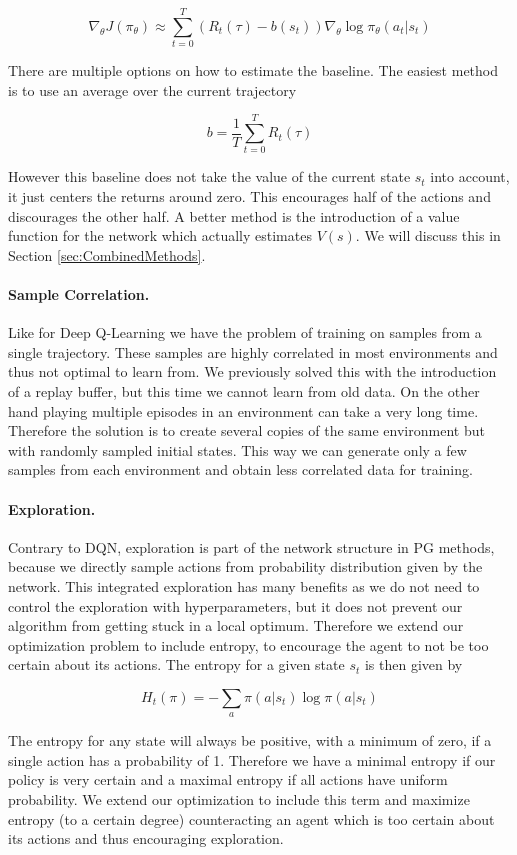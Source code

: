 \[\nabla_\theta J(\pi_\theta) \approx \sum^T_{t=0}(R_t(\tau) - b(s_t)) \nabla_\theta \log \pi_\theta(a_t|s_t)\]

There are multiple options on how to estimate the baseline. The easiest method is to use an average over the current trajectory

\[b = \frac{1}{T} \sum^T_{t=0}R_t(\tau)\]

However this baseline does not take the value of the current state $s_t$ into account, it just centers the returns around zero. This encourages half of the actions and discourages the other half. A better method is the introduction of a value function for the network which actually estimates $V(s)$. We will discuss this in Section \ref{sec:CombinedMethods}.

\paragraph{Sample Correlation.}
Like for Deep Q-Learning we have the problem of training on samples from a single trajectory. These samples are highly correlated in most environments and thus not optimal to learn from. We previously solved this with the introduction of a replay buffer, but this time we cannot learn from old data. On the other hand playing multiple episodes in an environment can take a very long time. Therefore the solution is to create several copies of the same environment but with randomly sampled initial states. This way we can generate only a few samples from each environment and obtain less correlated data for training.

\paragraph{Exploration.}
Contrary to DQN, exploration is part of the network structure in PG methods, because we directly sample actions from probability distribution given by the network. This integrated exploration has many benefits as we do not need to control the exploration with hyperparameters, but it does not prevent our algorithm from getting stuck in a local optimum. Therefore we extend our optimization problem to include entropy, to encourage the agent to not be too certain about its actions. The entropy for a given state $s_t$ is then given by

\[H_t(\pi) = -\sum_{a}\pi(a|s_t) \log \pi(a|s_t)\]

The entropy for any state will always be positive, with a minimum of zero, if a single action has a probability of 1. Therefore we have a minimal entropy if our policy is very certain and a maximal entropy if all actions have uniform probability. We extend our optimization to include this term and maximize entropy (to a certain degree) counteracting an agent which is too certain about its actions and thus encouraging exploration.

